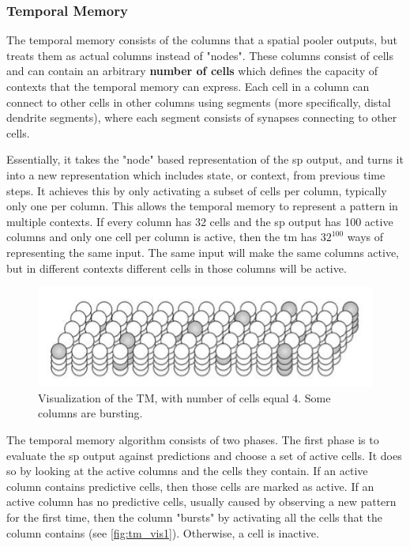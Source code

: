 \subsubsection{Temporal Memory}
\label{sec:temporal_memory}
The temporal memory consists of the columns that a spatial pooler outputs, but treats them as actual columns instead of "nodes". These columns consist of cells and can contain an arbitrary \textbf{number of cells} which defines the capacity of contexts that the temporal memory can express. Each cell in a column can connect to other cells in other columns using segments (more specifically, distal dendrite segments), where each segment consists of synapses connecting to other cells.
\par
Essentially, it takes the "node" based representation of the \gls*{sp} output, and turns it into a new representation which includes state, or context, from previous time steps. It achieves this by only activating a subset of cells per column, typically only one per column. This allows the temporal memory to represent a pattern in multiple contexts. If every column has 32 cells and the \gls*{sp} output has 100 active columns and only one cell per column is active, then the \gls*{tm} has $32^{100}$ ways of representing the same input. The same input will make the same columns active, but in different contexts different cells in those columns will be active.
\begin{figure}[H]
    \centering
    \includegraphics[width=\linewidth]{resources/related_works/tm_vis_alt2}
    \caption{Visualization of the TM, with number of cells equal 4. Some columns are bursting.}
\end{figure}
\par
The temporal memory algorithm consists of two phases. The first phase is to evaluate the \gls*{sp} output against predictions and choose a set of active cells. It does so by looking at the active columns and the cells they contain. If an active column contains predictive cells, then those cells are marked as active. If an active column has no predictive cells, usually caused by observing a new pattern for the first time, then the column "bursts" by activating all the cells that the column contains (see \autoref{fig:tm_vis1}). Otherwise, a cell is inactive.
